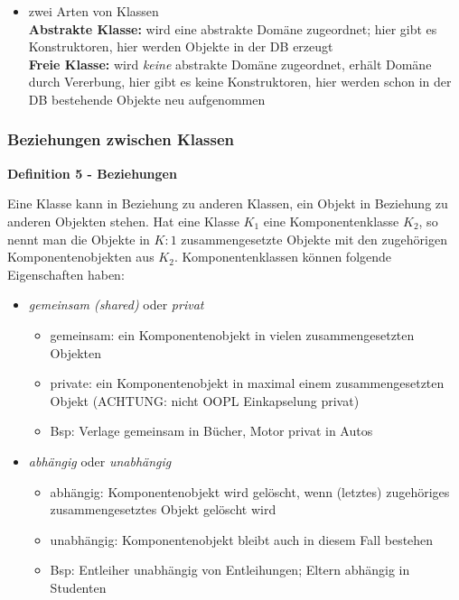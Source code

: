 \begin{itemize}
	\item zwei Arten von Klassen\\
	\textbf{Abstrakte Klasse:} wird eine abstrakte Domäne zugeordnet; hier gibt es Konstruktoren, hier werden Objekte in der DB erzeugt\\
	\textbf{Freie Klasse:} wird \textit{keine} abstrakte Domäne zugeordnet, erhält Domäne durch Vererbung, hier gibt es keine Konstruktoren, hier werden schon in der DB bestehende Objekte neu aufgenommen
\end{itemize}

\subsubsection{Beziehungen zwischen Klassen}
\begin{framed}
	\textbf{Definition 5 - Beziehungen}
	\begin{description}
		\item Eine Klasse kann in Beziehung zu anderen Klassen, ein Objekt in Beziehung zu anderen Objekten stehen. Hat eine Klasse $K_1$ eine Komponentenklasse $K_2$, so nennt man die Objekte in $K:1$ zusammengesetzte Objekte mit den zugehörigen Komponentenobjekten aus $K_2$. Komponentenklassen können folgende Eigenschaften haben:
		\begin{itemize}
			\item \textit{gemeinsam (shared)} oder \textit{privat}
			\begin{itemize}
				\item gemeinsam: ein Komponentenobjekt in vielen zusammengesetzten Objekten
				\item private: ein Komponentenobjekt in maximal einem zusammengesetzten Objekt (ACHTUNG: nicht OOPL Einkapselung privat)
				\item Bsp: Verlage gemeinsam in Bücher, Motor privat in Autos
			\end{itemize}
			
			\item \textit{abhängig} oder \textit{unabhängig}
			\begin{itemize}
				\item abhängig: Komponentenobjekt wird gelöscht, wenn (letztes) zugehöriges zusammengesetztes Objekt gelöscht wird
				\item unabhängig: Komponentenobjekt bleibt auch in diesem Fall bestehen
				\item Bsp: Entleiher unabhängig von Entleihungen; Eltern abhängig in Studenten
			\end{itemize}
			

\end{itemize}
\end{description}
\end{framed}
